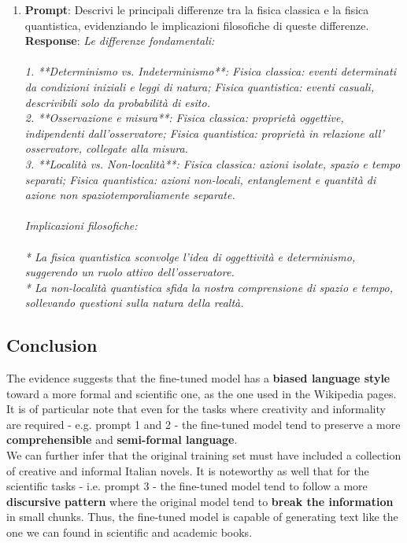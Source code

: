 \documentclass{article}
\begin{document}
\begin{enumerate}
		\item 
		\textbf{Prompt}: Descrivi le principali differenze tra la fisica classica e la fisica quantistica, evidenziando le implicazioni filosofiche di queste differenze.\\
		\textbf{Response}: \textit{Le differenze fondamentali:\\\\1. **Determinismo vs. Indeterminismo**: Fisica classica: eventi determinati da condizioni iniziali e leggi di natura; Fisica quantistica: eventi casuali, descrivibili solo da probabilità di esito.\\2. **Osservazione e misura**: Fisica classica: proprietà oggettive, indipendenti dall'osservatore; Fisica quantistica: proprietà in relazione all' osservatore, collegate alla misura.\\3. **Località vs. Non-località**: Fisica classica: azioni isolate, spazio e tempo separati; Fisica quantistica: azioni non-locali, entanglement e quantità di azione non spaziotemporaliamente separate.\\\\Implicazioni filosofiche:\\\\* La fisica quantistica sconvolge l'idea di oggettività e determinismo, suggerendo un ruolo attivo dell'osservatore.\\* La non-località quantistica sfida la nostra comprensione di spazio e tempo, sollevando questioni sulla natura della realtà.}
		
	\end{enumerate}

	\subsection{Conclusion}
	The evidence suggests that the fine-tuned model has a \textbf{biased language style} toward a more formal and scientific one, as the one used in the Wikipedia pages. It is of particular note that even for the tasks where creativity and informality are required - e.g. prompt 1 and 2 - the fine-tuned model tend to preserve a more \textbf{comprehensible} and \textbf{semi-formal language}. \\
	We can further infer that the original training set must have included a collection of creative and informal Italian novels.
	It is noteworthy as well that for the scientific tasks - i.e. prompt 3 - the fine-tuned model tend to follow a more \textbf{discursive pattern} where the original model tend to \textbf{break the information} in small chunks. 
	Thus, the fine-tuned model is capable of generating text like the one we can found in scientific and academic books. 	
	
\end{document}
